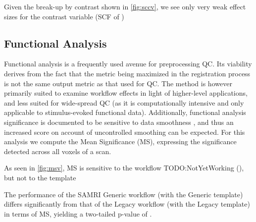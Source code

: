 
Given the break-up by contrast shown in \cref{fig:sccv}, we see only very weak effect sizes for the contrast variable
(SCF of )
\iffalse
\subsection{Functional Analysis}

Functional analysis is a frequently used avenue for preprocessing QC.
Its viability derives from the fact that the metric being maximized in the registration process is not the same output metric as that used for QC.
The method is however primarily suited to examine workflow effects in light of higher-level applications, and less suited for wide-spread QC (as it is computationally intensive and only applicable to stimulus-evoked functional data).
Additionally, functional analysis significance is documented to be sensitive to data smoothness \cite{Molloy2014}, and thus an increased score on account of uncontrolled smoothing can be expected.
For this analysis we compute the Mean Significance (MS), expressing the significance detected across all voxels of a scan.

As seen in \cref{fig:msv}, MS is sensitive to
the workflow TODO:NotYetWorking
(),
but not to the template

The performance of the SAMRI Generic workflow (with the Generic template) differs significantly from that of the Legacy workflow (with the Legacy template) in terms of MS, yielding a two-tailed p-value of .

